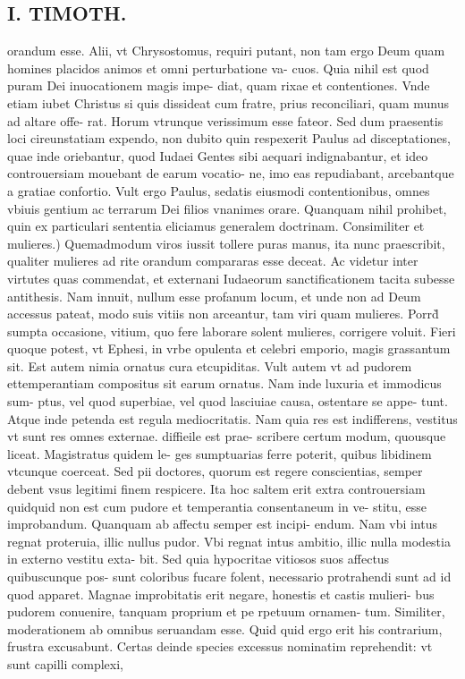 \documentclass{article}
\begin{document}
\begin{pages}
\section*{I. TIMOTH. }
\marginpar{[ p.26 ]}\pstart orandum esse. Alii, vt Chrysostomus, requiri putant, non tam ergo Deum quam homines placidos animos et omni perturbatione va- cuos. Quia nihil est quod puram Dei inuocationem magis impe- diat, quam rixae et contentiones. Vnde etiam iubet Christus si quis dissideat cum fratre, prius reconciliari, quam munus ad altare offe- rat. Horum vtrunque verissimum esse fateor. Sed dum praesentis loci cireunstatiam expendo, non dubito quin respexerit Paulus ad disceptationes, quae inde oriebantur, quod Iudaei Gentes sibi aequari indignabantur, et ideo controuersiam mouebant de earum vocatio- ne, imo eas repudiabant, arcebantque a gratiae confortio. Vult ergo Paulus, sedatis eiusmodi contentionibus, omnes vbiuis gentium ac terrarum Dei filios vnanimes orare. Quanquam nihil prohibet, quin ex particulari sententia eliciamus generalem doctrinam.  \pend\pstart Consimiliter et mulieres.) Quemadmodum viros iussit tollere puras manus, ita nunc praescribit, qualiter mulieres ad rite orandum compararas esse deceat. Ac videtur inter virtutes quas commendat, et externani Iudaeorum sanctificationem tacita subesse antithesis. Nam innuit, nullum esse profanum locum, et unde non ad Deum accessus pateat, modo suis vitiis non arceantur, tam viri quam mulieres. Porrd̀ sumpta occasione, vitium, quo fere laborare solent mulieres, corrigere voluit. Fieri quoque potest, vt Ephesi, in vrbe opulenta et celebri emporio, magis grassantum sit. Est autem nimia ornatus cura etcupiditas. Vult autem vt ad pudorem ettemperantiam compositus sit earum ornatus. Nam inde luxuria et immodicus sum- ptus, vel quod superbiae, vel quod lasciuiae causa, ostentare se appe- tunt. Atque inde petenda est regula mediocritatis. Nam quia res est indifferens, vestitus vt sunt res omnes externae. diffieile est prae- scribere certum modum, quousque liceat. Magistratus quidem le- ges sumptuarias ferre poterit, quibus libidinem vtcunque coerceat. Sed pii doctores, quorum est regere conscientias, semper debent vsus legitimi finem respicere. Ita hoc saltem erit extra controuersiam quidquid non est cum pudore et temperantia consentaneum in ve- stitu, esse improbandum. Quanquam ab affectu semper est incipi- endum. Nam vbi intus regnat proteruia, illic nullus pudor. Vbi regnat intus ambitio, illic nulla modestia in externo vestitu exta- bit. Sed quia hypocritae vitiosos suos affectus quibuscunque pos- sunt coloribus fucare folent, necessario protrahendi sunt ad id quod apparet. Magnae improbitatis erit negare, honestis et castis mulieri- bus pudorem conuenire, tanquam proprium et pe rpetuum ornamen- tum. Similiter, moderationem ab omnibus seruandam esse. Quid quid ergo erit his contrarium, frustra excusabunt. Certas deinde species excessus nominatim reprehendit: vt sunt capilli complexi,  \pend

\end{pages}
\end{document}
